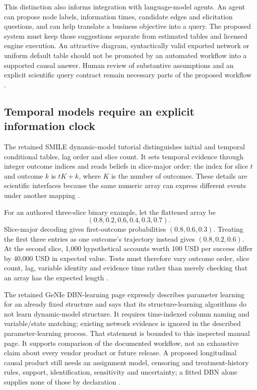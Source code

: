 This distinction also informs integration with language-model agents.
An agent can propose node labels, information times, candidate edges and
elicitation questions, and can help translate a business objective into a
query. The proposed system must keep those suggestions separate from
estimated tables and licensed engine execution. An attractive diagram,
syntactically valid exported network or uniform default table should not
be promoted by an automated workflow into a supported causal answer.
Human review of substantive assumptions and an explicit scientific query
contract remain necessary parts of the proposed workflow
\cite{exec24_smile_choice}.

\subsection{Temporal models require an explicit information clock}
The retained SMILE dynamic-model tutorial distinguishes initial and temporal
conditional tables, lag order and slice count. It sets temporal evidence
through integer outcome indices and reads beliefs in slice-major order:
the index for slice $t$ and outcome $k$ is $tK+k$, where $K$ is the number
of outcomes. These details are scientific interfaces because the same
numeric array can express different events under another mapping
\cite{exec13_ct_smile_tutorial}.

For an authored three-slice binary example, let the flattened array be
\[
 (0.8,0.2,0.6,0.4,0.3,0.7).
\]
Slice-major decoding gives first-outcome
probabilities $(0.8,0.6,0.3)$. Treating the first three entries as one
outcome's trajectory instead gives $(0.8,0.2,0.6)$. At the second slice,
1,000 hypothetical accounts worth 100 USD per success differ by
40,000 USD in expected value. Tests must therefore vary outcome order,
slice count, lag, variable identity and evidence time rather than merely
checking that an array has the expected length \cite{exec24_smile_choice}.

The retained GeNIe DBN-learning page expressly describes parameter learning
for an already fixed structure and says that its structure-learning
algorithms do not learn dynamic-model structure. It requires time-indexed
column naming and variable/state matching; existing network evidence is
ignored in the described parameter-learning process. That statement is
bounded to this inspected manual page. It supports comparison of the
documented workflow, not an exhaustive claim about every vendor product or
future release. A proposed longitudinal causal product still needs an
assignment model, censoring and treatment-history rules, support,
identification, sensitivity and uncertainty; a fitted DBN alone supplies
none of those by declaration
\cite{exec13_ct_genie_learning,exec24_smile_choice}.

